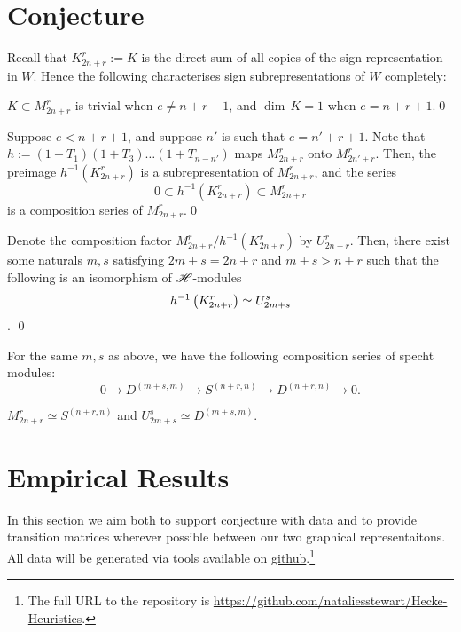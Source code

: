 \documentclass{amsart}
\begin{document}
\section{Conjecture}\label{Conjecture Section}
Recall that $K_{2n + r}^r := K$ is the direct sum of all copies of the sign representation in $W$.
Hence the following characterises sign subrepresentations of $W$ completely:
\begin{proposition}
  $K \subset M_{2n + r}^r$ is trivial when $e \neq n + r + 1$, and $\dim \, K = 1$ when $e = n + r + 1$.\qed
\end{proposition} 
\begin{proposition}
  Suppose $e < n + r + 1$, and suppose $n'$ is such that $e = n' + r + 1$.
  Note that $h := (1 + T_1)(1 + T_3)\dots(1 + T_{n - n'})$ maps $M_{2n + r}^r$ onto $M_{2n' + r}^r$.
  Then, the preimage $h^{-1}(K_{2n + r}^r)$ is a subrepresentation of $M_{2n + r}^r$, and the series
  \[
    0 \subset h^{-1}(K_{2n + r}^r) \subset M_{2n + r}^r
  \]
  is a composition series of $M_{2n + r}^r$.\qed
\end{proposition}
\begin{proposition}
  Denote the composition factor $M_{2n + r}^r / h^{-1}(K_{2n + r}^r)$ by $U_{2n + r}^r$.
  Then, there exist some naturals $m,s$ satisfying $2m + s = 2n + r$ and $m + s > n + r$ such that the following is an isomorphism of $\mathscr{H}$-modules \[h^{-1}\left( K_{2n + r}^r \right) \simeq U_{2m + s}^s\].
  \qed
\end{proposition}
\begin{proposition}
  For the same $m,s$ as above, we have the following composition series of specht modules:
  \[
    0 \longrightarrow D^{(m+s,m)} \longrightarrow S^{(n+r,n)} \longrightarrow D^{(n+r,n)} \longrightarrow 0.
  \]
\end{proposition}
\begin{proposition}
  $M_{2n + r}^r \simeq S^{(n+r,n)}$ and $U_{2m +s}^s \simeq D^{(m+s,m)}$.
\end{proposition}

\section{Empirical Results}\label{Empirics Section}
In this section we aim both to support conjecture with data and to provide transition matrices wherever possible between our two graphical representaitons.
All data will be generated via tools available on \href{https://github.com/nataliesstewart/Hecke-Heuristics}{github}.\footnote{The full URL to the repository is \href{https://github.com/nataliesstewart/Hecke-Heuristics}{https://github.com/nataliesstewart/Hecke-Heuristics}.}
\end{document}
